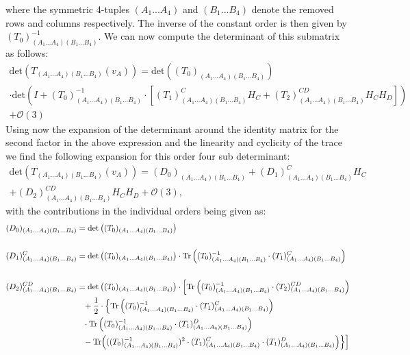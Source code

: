 where the symmetric 4-tuples $(A_1...A_4)$ and $(B_1...B_4)$ denote the removed rows and columns respectively. The inverse of the constant order is then given by $(T_0)^{-1}_{(A_1...A_4)(B_1...B_4)}$. We can now compute the determinant of this submatrix as follows:
\begin{multline}
    \mathrm{det}\left(T_{(A_1...A_4)(B_1...B_4)}(v_A)\right)
    = \mathrm{det}\left((T_0)_{(A_1...A_4)(B_1...B_4)}\right)\\ 
    \cdot \mathrm{det}\left (I +(T_0)^{-1}_{(A_1...A_4)(B_1...B_4)}
    \cdot \left [ (T_1)_{(A_1...A_4)(B_1...B_4)}^{C} H_C+(T_2)_{(A_1...A_4)(B_1...B_4)}^{CD} H_C H_D \right ]  \right ) \\
    + \mathcal{O}(3)  
\end{multline}
Using now the expansion of the determinant around the identity matrix for the second factor in the above expression and the linearity and cyclicity of the trace we
find the following expansion for this order four sub determinant:
\begin{multline}
    \mathrm{det}\left(T_{(A_1...A_4)(B_1...B_4)}(v_A)\right) = (D_0)_{(A_1...A_4)(B_1...B_4)} + (D_1)^C_{(A_1...A_4)(B_1...B_4)}H_C\\
    +(D_2)^{CD}_{(A_1...A_4)(B_1...B_4)}H_CH_D
    + \mathcal{O}(3),
\end{multline}
with the contributions in the individual orders being given as: 
\begin{align}\label{polyMatrices}
\begin{aligned}
  (D_0)_{(A_1...A_4)(B_1...B_4)} &=  \mathrm{det}\left((T_0)_{(A_1...A_4)(B_1...B_4)}\right) \\
  \\
  (D_1)^C_{(A_1...A_4)(B_1...B_4)} &= \mathrm{det}\left((T_0)_{(A_1...A_4)(B_1...B_4)}\right) \cdot \mathrm{Tr} \left ( (T_0)^{-1}_{(A_1...A_4)(B_1...B_4)}
    \cdot (T_1)_{(A_1...A_4)(B_1...B_4)}^{C} \right) \\
    \\
    (D_2)^{CD}_{(A_1...A_4)(B_1...B_4)} &= \mathrm{det}\left((T_0)_{(A_1...A_4)(B_1...B_4)}\right)
     \cdot \Bigl [ \mathrm{Tr} \left ( (T_0)^{-1}_{(A_1...A_4)(B_1...B_4)}
    \cdot (T_2)_{(A_1...A_4)(B_1...B_4)}^{CD} \right ) \\
     &\hphantom{=}
    + \frac{1}{2} \cdot \Bigl \{ \mathrm{Tr}\left ( (T_0)^{-1}_{(A_1...A_4)(B_1...B_4)} \cdot (T_1)_{(A_1...A_4)(B_1...B_4)}^{C} \right )\\
     &\hphantom{=} \cdot \mathrm{Tr}\left ( (T_0)^{-1}_{(A_1...A_4)(B_1...B_4)} \cdot (T_1)_{(A_1...A_4)(B_1...B_4)}^{D} \right )  \\
      &\hphantom{=} 
    - \mathrm{Tr}\Bigl  (((T_0)^{-1}_{(A_1...A_4)(B_1...B_4)})^2 \cdot (T_1)_{(A_1...A_4)(B_1...B_4)}^{C} \cdot (T_1)_{(A_1...A_4)(B_1...B_4)}^{D}  \Bigr )    \Bigr \} \Bigr ]
    \end{aligned}
\end{align}
